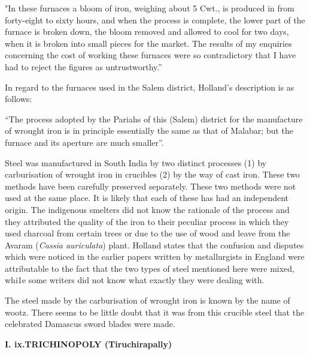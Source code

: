 "In these furnaces a bloom of iron, weighing about 5 Cwt., is produced in from forty-eight to sixty hours, and when the process is complete, the lower part of the furnace is broken down, the bloom removed and allowed to cool for two days, when it is broken into small pieces for the market. The results of my enquiries concerning the cost of working these furnaces were so contradictory that I have had to reject the figures as untrustworthy.”

In regard to the furnaces used in the Salem district, Holland’s description is as follows:

“The process adopted by the Pariahs of this (Salem) district for the manufacture of wrought iron is in principle essentially the same as that of Malabar; but the furnace and its aperture are much smaller”.

Steel was manufactured in South India by two distinct processes (1) by carburisation of wrought iron in crucibles (2) by the way of cast iron. These two methods have been carefully preserved separately. These two methods were not used at the same place. It is likely that each of these has had an independent origin. The indigenous smelters did not know the rationale of the process and they attributed the quality of the iron to their peculiar process in which they used charcoal from certain trees or due to the use of wood and leave from the Avaram (\textit{Cassia auriculata}) plant. Holland states that the confusion and disputes which were noticed in the earlier papers written by metallurgists in England were attributable to the fact that the two types of steel mentioned here were mixed, whi1e some writers did not know what exactly they were dealing with.

The steel made by the carburisation of wrought iron is known by the name of wootz. There seems to be little doubt that it was from this crucible steel that the celebrated Damascus sword blades were made.

\textbf{I. ix.}\textbf{TRICHINOPOLY (Tiruchirapally)}

